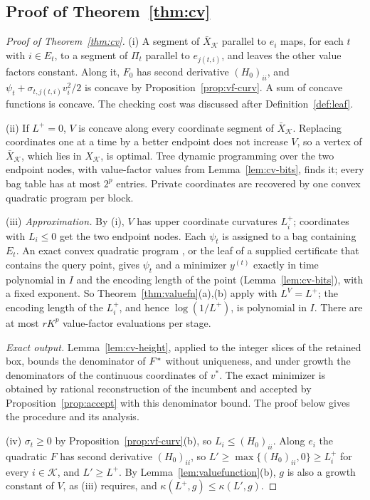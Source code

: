 \subsection{Proof of Theorem~\ref{thm:cv}}\label{app:cv-proof}

\begin{proof}[Proof of Theorem~\ref{thm:cv}]
(i) A segment of $\bar X_{\mathcal K}$ parallel to $e_i$ maps, for each $t$
with $i\in E_t$, to a segment of $\Pi_t$ parallel to $e_{j(t,i)}$, and
leaves the other value factors constant. Along it, $F_0$ has second
derivative $(H_0)_{ii}$, and $\psi_t+\sigma_{t,j(t,i)}v_i^2/2$ is concave by
Proposition~\ref{prop:vf-curv}. A sum of concave functions is concave. The
checking cost was discussed after Definition~\ref{def:leaf}.

(ii) If $L^+=0$, $V$ is concave along every coordinate segment of
$\bar X_{\mathcal K}$. Replacing coordinates one at a time by a better
endpoint does not increase $V$, so a vertex of $\bar X_{\mathcal K}$, which
lies in $X_{\mathcal K}$, is optimal. Tree dynamic programming over the two
endpoint nodes, with value-factor values from
Lemma~\ref{lem:cv-bits}, finds it; every bag table has at most $2^p$
entries. Private coordinates are recovered by one convex quadratic program
per block.

(iii) \emph{Approximation.} By (i), $V$ has upper coordinate curvatures
$L_i^+$; coordinates with $L_i\le0$ get the two endpoint nodes. Each
$\psi_t$ is assigned to a bag containing $E_t$. An exact convex quadratic
program \cite{KozlovTarasovKhachiyan1980}, or the leaf of a supplied
certificate that contains the query point, gives $\psi_t$ and a minimizer
$y^{(t)}$ exactly in time polynomial in $I$ and the encoding length of the
point (Lemma~\ref{lem:cv-bits}), with a fixed exponent. So
Theorem~\ref{thm:valuefn}(a),(b) apply with $L^V=L^+$; the encoding length
of the $L_i^+$, and hence $\log(1/L^+)$, is polynomial in $I$. There are at
most $rK^p$ value-factor evaluations per stage.

\emph{Exact output.} Lemma~\ref{lem:cv-height}, applied to the integer
slices of the retained box, bounds the denominator of $F^{*}$ without
uniqueness, and under growth the denominators of the continuous coordinates
of $v^*$. The exact minimizer is obtained by rational reconstruction of the
incumbent and accepted by Proposition~\ref{prop:accept} with this
denominator bound. The proof below gives the procedure and its
analysis.

(iv) $\sigma_t\ge0$ by Proposition~\ref{prop:vf-curv}(b), so
$L_i\le(H_0)_{ii}$. Along $e_i$ the quadratic $F$ has second derivative
$(H_0)_{ii}$, so $L'\ge\max\{(H_0)_{ii},0\}\ge L_i^+$ for every
$i\in\mathcal K$, and $L'\ge L^+$. By Lemma~\ref{lem:valuefunction}(b),
$g$ is also a growth constant of $V$, as (iii) requires, and
$\kappa(L^+,g)\le\kappa(L',g)$.
\end{proof}

